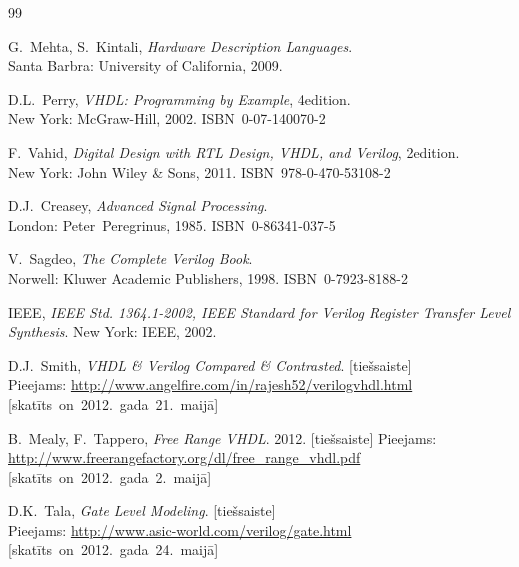 \documentclass[12pt,a4paper]{article}
\begin{document}
	
	\clearpage
	{\raggedright
	\begin{thebibliography}{99}
			G.~Mehta, S.~Kintali,
			\textit{Hardware Description Languages}.\\
			Santa Barbra: University of California,
			2009.

			D.L.~Perry,
			\textit{VHDL: Programming by Example}, 4\nth edition.\\
			New York: McGraw-Hill, 2002. ISBN~0-07-140070-2

			F.~Vahid,
			\textit{Digital Design with RTL Design, VHDL, and Verilog},
			2\nd edition.\\
			New York: John Wiley \& Sons, 2011. ISBN~978-0-470-53108-2

			D.J.~Creasey,
			\textit{Advanced Signal Processing}.\\
			London: Peter~Peregrinus, 1985. ISBN~0-86341-037-5

			V.~Sagdeo,
			\textit{The Complete Verilog Book}.\\
			Norwell: Kluwer Academic Publishers, 1998. ISBN~0-7923-8188-2

			IEEE,
			\textit{IEEE Std. 1364.1-2002, IEEE Standard for Verilog Register Transfer Level Synthesis}.
			New York: IEEE, 2002.

			D.J.~Smith,
			\textit{VHDL \& Verilog Compared \& Contrasted}. [tiešsaiste]\\
			Pieejams: \url{http://www.angelfire.com/in/rajesh52/verilogvhdl.html}
			\mbox{[skatīts on 2012.~gada 21.~maijā]}

			B.~Mealy, F.~Tappero,
			\textit{Free Range VHDL}.
			2012. [tiešsaiste] \linebreak[2]
			Pieejams: \url{http://www.freerangefactory.org/dl/free_range_vhdl.pdf}\\
			\mbox{[skatīts on 2012.~gada 2.~maijā]}

			D.K.~Tala, \textit{Gate Level Modeling}. [tiešsaiste]\\
			Pieejams: \url{http://www.asic-world.com/verilog/gate.html}
			\mbox{[skatīts on 2012.~gada 24.~maijā]}


\end{thebibliography}}
\end{document}
